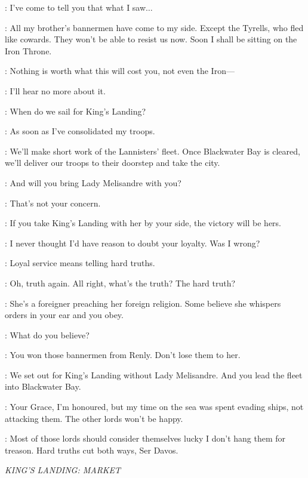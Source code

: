 \DAVOS: I've come to tell you that what I saw$\ldots$  

\STANNIS: All my brother's bannermen have come to my side. Except the Tyrells, who fled like cowards. They won't be able to resist us now. Soon I shall be sitting on the Iron Throne. 

\DAVOS: Nothing is worth what this will cost you, not even the Iron--- 

\STANNIS: I'll hear no more about it. 


\STANNIS: When do we sail for King's Landing? 

\DAVOS: As soon as I've consolidated my troops. 

\STANNIS: We'll make short work of the Lannisters' fleet. Once Blackwater Bay is cleared, we'll deliver our troops to their doorstep and take the city. 

\DAVOS: And will you bring Lady Melisandre with you? 

\STANNIS: That's not your concern. 

\DAVOS: If you take King's Landing with her by your side, the victory will be hers. 

\STANNIS: I never thought I'd have reason to doubt your loyalty. Was I wrong? 

\DAVOS: Loyal service means telling hard truths. 

\STANNIS: Oh, truth again. All right, what's the truth? The hard truth? 

\DAVOS: She's a foreigner preaching her foreign religion. Some believe she whispers orders in your ear and you obey. 

\STANNIS: What do you believe? 

\DAVOS: You won those bannermen from Renly. Don't lose them to her. 

\STANNIS: We set out for King's Landing without Lady Melisandre. And you lead the fleet into Blackwater Bay. 

\DAVOS: Your Grace, I'm honoured, but my time on the sea was spent evading ships, not attacking them. The other lords won't be happy. 

\STANNIS: Most of those lords should consider themselves lucky I don't hang them for treason. Hard truths cut both ways, Ser Davos. 



\scene

\textit{KING'S LANDING: MARKET} 

